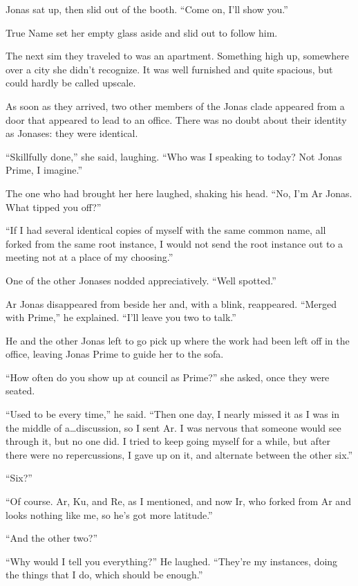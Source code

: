 Jonas sat up, then slid out of the booth. ``Come on, I'll show you.''

True Name set her empty glass aside and slid out to follow him.

The next sim they traveled to was an apartment. Something high up, somewhere over a city she didn't recognize. It was well furnished and quite spacious, but could hardly be called upscale.

As soon as they arrived, two other members of the Jonas clade appeared from a door that appeared to lead to an office. There was no doubt about their identity as Jonases: they were identical.

``Skillfully done,'' she said, laughing. ``Who was I speaking to today? Not Jonas Prime, I imagine.''

The one who had brought her here laughed, shaking his head. ``No, I'm Ar Jonas. What tipped you off?''

``If I had several identical copies of myself with the same common name, all forked from the same root instance, I would not send the root instance out to a meeting not at a place of my choosing.''

One of the other Jonases nodded appreciatively. ``Well spotted.''

Ar Jonas disappeared from beside her and, with a blink, reappeared. ``Merged with Prime,'' he explained. ``I'll leave you two to talk.''

He and the other Jonas left to go pick up where the work had been left off in the office, leaving Jonas Prime to guide her to the sofa.

``How often do you show up at council as Prime?'' she asked, once they were seated.

``Used to be every time,'' he said. ``Then one day, I nearly missed it as I was in the middle of a\ldots discussion, so I sent Ar. I was nervous that someone would see through it, but no one did. I tried to keep going myself for a while, but after there were no repercussions, I gave up on it, and alternate between the other six.''

``Six?''

``Of course. Ar, Ku, and Re, as I mentioned, and now Ir, who forked from Ar and looks nothing like me, so he's got more latitude.''

``And the other two?''

``Why would I tell you everything?'' He laughed. ``They're my instances, doing the things that I do, which should be enough.''

